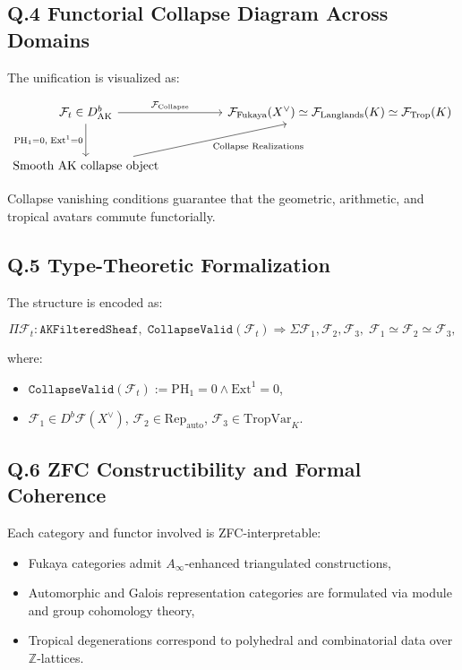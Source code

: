\documentclass[11pt]{article}
\begin{document}
\subsection*{Q.4 Functorial Collapse Diagram Across Domains}

The unification is visualized as:

\[
\begin{tikzcd}[column sep=huge, row sep=large]
\mathcal{F}_t \in D^b_{\mathrm{AK}} \arrow[r, "{\mathcal{F}_{\mathrm{Collapse}}}"] \arrow[d, swap, "{\mathrm{PH}_1 = 0,\; \mathrm{Ext}^1 = 0}"]
& \mathcal{F}_{\mathrm{Fukaya}}(X^\vee) \simeq \mathcal{F}_{\mathrm{Langlands}}(K) \simeq \mathcal{F}_{\mathrm{Trop}}(K) \\
\text{Smooth AK collapse object} \arrow[ru, swap, "{\text{Collapse Realizations}}"] &
\end{tikzcd}
\]


Collapse vanishing conditions guarantee that the geometric, arithmetic, and tropical avatars commute functorially.

\subsection*{Q.5 Type-Theoretic Formalization}

The structure is encoded as:

\[
\Pi \mathcal{F}_t : \texttt{AKFilteredSheaf},\;
\texttt{CollapseValid}(\mathcal{F}_t)
\Rightarrow
\Sigma \mathcal{F}_1, \mathcal{F}_2, \mathcal{F}_3,\;
\mathcal{F}_1 \simeq \mathcal{F}_2 \simeq \mathcal{F}_3,
\]

where:
\begin{itemize}
  \item $\texttt{CollapseValid}(\mathcal{F}_t) := \mathrm{PH}_1 = 0 \wedge \mathrm{Ext}^1 = 0$,
  \item $\mathcal{F}_1 \in D^b\mathcal{F}(X^\vee)$, $\mathcal{F}_2 \in \mathrm{Rep}_{\mathrm{auto}}$, $\mathcal{F}_3 \in \mathrm{TropVar}_K$.
\end{itemize}

\subsection*{Q.6 ZFC Constructibility and Formal Coherence}

Each category and functor involved is ZFC-interpretable:

\begin{itemize}
  \item Fukaya categories admit $A_\infty$-enhanced triangulated constructions,
  \item Automorphic and Galois representation categories are formulated via module and group cohomology theory,
  \item Tropical degenerations correspond to polyhedral and combinatorial data over $\mathbb{Z}$-lattices.
\end{itemize}
\end{document}
